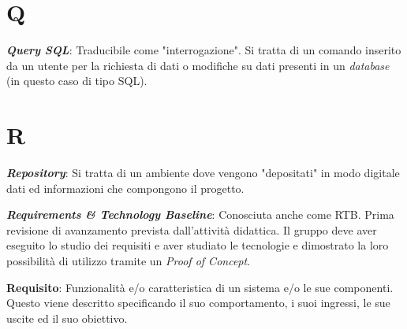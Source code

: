 \documentclass[5pt]{article}
\begin{document}
\pagebreak

\section*{Q}
\begin{flushleft}

\textbf{\textit{Query SQL}}: Traducibile come "interrogazione". Si tratta di un comando inserito da un utente per la richiesta di dati o modifiche su dati presenti in un \textit{database} (in questo caso di tipo SQL).

\end{flushleft}

\pagebreak

\section*{R}
\begin{flushleft}

\textbf{\textit{Repository}}: Si tratta di un ambiente dove vengono "depositati" in modo digitale dati ed informazioni che compongono il progetto.\newline

\textbf{\textit{Requirements \& Technology Baseline}}: Conosciuta anche come RTB. Prima revisione di avanzamento prevista dall'attività didattica. Il gruppo deve aver eseguito lo studio dei requisiti e aver studiato le tecnologie e dimostrato la loro possibilità di utilizzo tramite un \textit{Proof of Concept}.\newline

\textbf{Requisito}: Funzionalità e/o caratteristica di un sistema e/o le sue componenti. Questo viene descritto specificando il suo comportamento, i suoi ingressi, le sue uscite ed il suo obiettivo.

\end{flushleft}

\pagebreak
\end{document}
